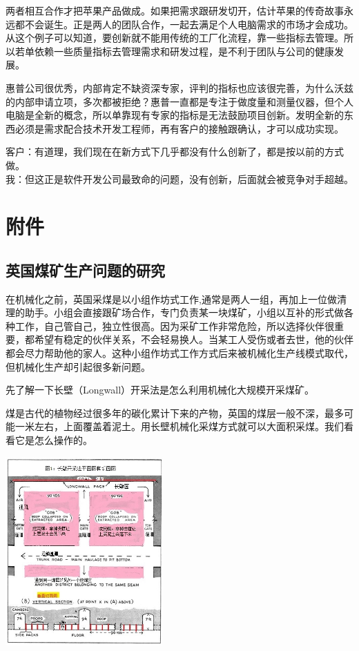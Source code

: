 两者相互合作才把苹果产品做成。如果把需求跟研发切开，估计苹果的传奇故事永远都不会诞生。正是两人的团队合作，一起去满足个人电脑需求的市场才会成功。从这个例子可以知道，要创新就不能用传统的工厂化流程，靠一些指标去管理。所以若单依赖一些质量指标去管理需求和研发过程，是不利于团队与公司的健康发展。

惠普公司很优秀，内部肯定不缺资深专家，评判的指标也应该很完善，为什么沃兹的内部申请立项，多次都被拒绝？惠普一直都是专注于做度量和测量仪器，但个人电脑是全新的概念，所以单靠现有专家的指标是无法鼓励项目创新。发明全新的东西必须是需求配合技术开发工程师，再有客户的接触跟确认，才可以成功实现。

客户：有道理，我们现在在新方式下几乎都没有什么创新了，都是按以前的方式做。\\
我：但这正是软件开发公司最致命的问题，没有创新，后面就会被竞争对手超越。\\

\hypertarget{ux9644ux4ef6}{%
\section{附件}\label{ux9644ux4ef6}}

\hypertarget{ux82f1ux56fdux7164ux77ffux751fux4ea7ux95eeux9898ux7684ux7814ux7a76}{%
\subsection{英国煤矿生产问题的研究}\label{ux82f1ux56fdux7164ux77ffux751fux4ea7ux95eeux9898ux7684ux7814ux7a76}}

在机械化之前，英国采煤是以小组作坊式工作,通常是两人一组，再加上一位做清理的助手。小组会直接跟矿场合作，专门负责某一块煤矿，小组以互补的形式做各种工作，自己管自己，独立性很高。因为采矿工作非常危险，所以选择伙伴很重要，都希望有稳定的伙伴关系，不会轻易换人。当某工人受伤或者去世，他的伙伴都会尽力帮助他的家人。这种小组作坊式工作方式后来被机械化生产线模式取代，但机械化生产却引起很多新问题。

先了解一下长壁（Longwall）开采法是怎么利用机械化大规模开采煤矿。

煤是古代的植物经过很多年的碳化累计下来的产物，英国的煤层一般不深，最多可能一米左右，上面覆盖着泥土。用长壁机械化采煤方式就可以大面积采煤。我们看看它是怎么操作的。


\includegraphics[width=6cm]{langwall-修改562.jpg}

